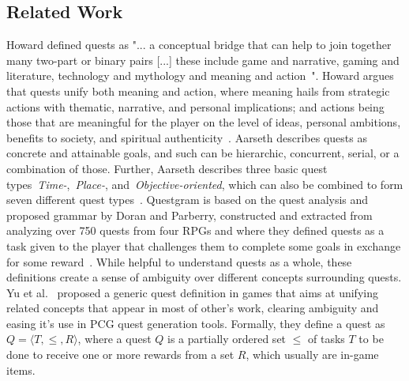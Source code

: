 \subsection{Related Work}

Howard defined quests as "... a conceptual bridge that can help to join together many two-part or binary pairs [...] these include game and narrative, gaming and literature, technology and mythology and meaning and action~\cite{p812-howard2008quests}". Howard argues that quests unify both meaning and action, where meaning hails from strategic actions with thematic, narrative, and personal implications; and actions being those that are meaningful for the player on the level of ideas, personal ambitions, benefits to society, and spiritual authenticity~\cite{p812-howard2008quests}. Aarseth describes quests as concrete and attainable goals, and such can be hierarchic, concurrent, serial, or a combination of those. Further, Aarseth describes three basic quest types~\emph{Time-},~\emph{Place-}, and~\emph{Objective-oriented}, which can also be combined to form seven different quest types~\cite{p8aarseth2005hunt}. Questgram is based on the quest analysis and proposed grammar by Doran and Parberry, constructed and extracted from analyzing over 750 quests from four RPGs and where they defined quests as a task given to the player that challenges them to complete some goals in exchange for some reward~\cite{p8Doran2011-questsMMORPGs}. While helpful to understand quests as a whole, these definitions create a sense of ambiguity over different concepts surrounding quests. Yu et al.~\cite{p8yu2020quest} proposed a generic quest definition in games that aims at unifying related concepts that appear in most of other's work, clearing ambiguity and easing it's use in PCG quest generation tools. Formally, they define a quest as $Q = \langle T, \leq, R \rangle$, where a quest $Q$ is a partially ordered set $\leq$ of tasks $T$ to be done to receive one or more rewards from a set $R$, which usually are in-game items.


